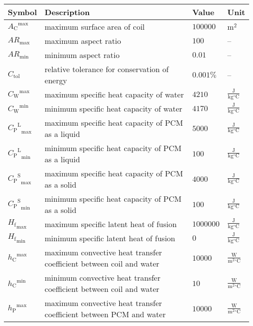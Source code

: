 \documentclass[12pt]{article}
\begin{document}
\begin{longtabu}{l X[l] l l}
\toprule
\textbf{Symbol} & \textbf{Description} & \textbf{Value} & \textbf{Unit}
\\
\midrule
\endhead
${{A_{\text{C}}}^{\text{max}}}$ & maximum surface area of coil & $100000$ & ${\text{m}^{2}}$
\\
${AR_{\text{max}}}$ & maximum aspect ratio & $100$ & --
\\
${AR_{\text{min}}}$ & minimum aspect ratio & $0.01$ & --
\\
${C_{\text{tol}}}$ & relative tolerance for conservation of energy & $0.001\%$ & --
\\
${{C_{\text{W}}}^{\text{max}}}$ & maximum specific heat capacity of water & $4210$ & $\frac{\text{J}}{\text{kg}{}^{\circ}\text{C}}$
\\
${{C_{\text{W}}}^{\text{min}}}$ & minimum specific heat capacity of water & $4170$ & $\frac{\text{J}}{\text{kg}{}^{\circ}\text{C}}$
\\
${{{C_{\text{P}}}^{\text{L}}}_{\text{max}}}$ & maximum specific heat capacity of PCM as a liquid & $5000$ & $\frac{\text{J}}{\text{kg}{}^{\circ}\text{C}}$
\\
${{{C_{\text{P}}}^{\text{L}}}_{\text{min}}}$ & minimum specific heat capacity of PCM as a liquid & $100$ & $\frac{\text{J}}{\text{kg}{}^{\circ}\text{C}}$
\\
${{{C_{\text{P}}}^{\text{S}}}_{\text{max}}}$ & maximum specific heat capacity of PCM as a solid & $4000$ & $\frac{\text{J}}{\text{kg}{}^{\circ}\text{C}}$
\\
${{{C_{\text{P}}}^{\text{S}}}_{\text{min}}}$ & minimum specific heat capacity of PCM as a solid & $100$ & $\frac{\text{J}}{\text{kg}{}^{\circ}\text{C}}$
\\
${{H_{\text{f}}}_{\text{max}}}$ & maximum specific latent heat of fusion & $1000000$ & $\frac{\text{J}}{\text{kg}{}^{\circ}\text{C}}$
\\
${{H_{\text{f}}}_{\text{min}}}$ & minimum specific latent heat of fusion & $0$ & $\frac{\text{J}}{\text{kg}{}^{\circ}\text{C}}$
\\
${{h_{\text{C}}}^{\text{max}}}$ & maximum convective heat transfer coefficient between coil and water & $10000$ & $\frac{\text{W}}{\text{m}^{2}{}^{\circ}\text{C}}$
\\
${{h_{\text{C}}}^{\text{min}}}$ & minimum convective heat transfer coefficient between coil and water & $10$ & $\frac{\text{W}}{\text{m}^{2}{}^{\circ}\text{C}}$
\\
${{h_{\text{P}}}^{\text{max}}}$ & maximum convective heat transfer coefficient between PCM and water & $10000$ & $\frac{\text{W}}{\text{m}^{2}{}^{\circ}\text{C}}$

\end{longtabu}
\end{document}
